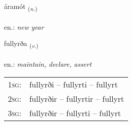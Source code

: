 \documentclass[frontgrid, backgrid]{flacards}\usepackage[]{graphicx}\usepackage[]{xcolor}
\begin{document}
\renewcommand{\flhead}{\vskip5pt \fboxsep=0pt {\small\bfseries\footnotesize Nafnorð | Noun}}
\renewcommand{\fcfoot}{\vskip5pt \fboxsep=0pt \hspace{2pt}{\small\bfseries\footnotesize 2K}}

\renewcommand{\blhead}{\vskip5pt {\small\bfseries\footnotesize Nafnorð | Noun }}
\renewcommand{\bcfoot}{\vskip5pt \hspace{2pt}{\small\bfseries\footnotesize 2K}}


{áramót \small{\textsubscript{(\textit{n.})}} \\[1ex] %
\textphonetic{[auːramout]} \\
en.: \emph{new year} \\  [2ex]
\renewcommand*{\arraystretch}{0.8}
}

\renewcommand{\flhead}{\vskip5pt \fboxsep=0pt {\small\bfseries\footnotesize Sagnorð | Verb}}
\renewcommand{\fcfoot}{\vskip5pt \fboxsep=0pt \hspace{2pt}{\small\bfseries\footnotesize 2K}}

\renewcommand{\blhead}{\vskip5pt {\small\bfseries\footnotesize Sagnorð | Verb }}
\renewcommand{\bcfoot}{\vskip5pt \hspace{2pt}{\small\bfseries\footnotesize 2K}}


{fullyrða \small{\textsubscript{(\textit{v.})}} \\[1ex] %
\textphonetic{[fʏtlɪrða]} \\
en.: \emph{maintain, declare, assert} \\  [2ex]
\renewcommand*{\arraystretch}{0.8}
\begin{tabular}{p{1cm}l}
\textsc{1sg}: & fullyrði -- fullyrti -- fullyrt \\ 
\textsc{2sg}: & fullyrðir -- fullyrtir -- fullyrt \\ 
\textsc{3sg}: & fullyrðir -- fullyrti -- fullyrt \\ 
\end{tabular}
}
\end{document}
